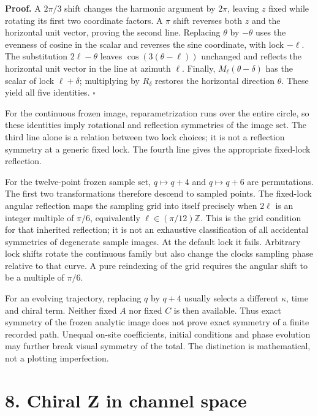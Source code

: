 \documentclass[
  11pt,
  a4paper,
]{article}
\begin{document}
\textbf{Proof.} A \(2\pi/3\) shift changes the harmonic argument by \(2\pi\), leaving \(z\) fixed while rotating its first two coordinate factors. A \(\pi\) shift reverses both \(z\) and the horizontal unit vector, proving the second line. Replacing \(\theta\) by \(-\theta\) uses the evenness of cosine in the scalar and reverses the sine coordinate, with lock \(-\ell\). The substitution \(2\ell-\theta\) leaves \(\cos(3(\theta-\ell))\) unchanged and reflects the horizontal unit vector in the line at azimuth \(\ell\). Finally, \(M_\ell(\theta-\delta)\) has the scalar of lock \(\ell+\delta\); multiplying by \(R_\delta\) restores the horizontal direction \(\theta\). These yield all five identities. \(\square\)

For the continuous frozen image, reparametrization runs over the entire circle, so these identities imply rotational and reflection symmetries of the image set. The third line alone is a relation between two lock choices; it is not a reflection symmetry at a generic fixed lock. The fourth line gives the appropriate fixed-lock reflection.

For the twelve-point frozen sample set, \(q\mapsto q+4\) and \(q\mapsto q+6\) are permutations. The first two transformations therefore descend to sampled points. The fixed-lock angular reflection maps the sampling grid into itself precisely when \(2\ell\) is an integer multiple of \(\pi/6\), equivalently \(\ell\in(\pi/12)\mathbb Z\). This is the grid condition for that inherited reflection; it is not an exhaustive classification of all accidental symmetries of degenerate sample images. At the default lock it fails. Arbitrary lock shifts rotate the continuous family but also change the clock\textquotesingle s sampling phase relative to that curve. A pure reindexing of the grid requires the angular shift to be a multiple of \(\pi/6\).

For an evolving trajectory, replacing \(q\) by \(q+4\) usually selects a different \(\kappa\), time and chiral term. Neither fixed \(A\) nor fixed \(C\) is then available. Thus exact symmetry of the frozen analytic image does not prove exact symmetry of a finite recorded path. Unequal on-site coefficients, initial conditions and phase evolution may further break visual symmetry of the total. The distinction is mathematical, not a plotting imperfection.

\section{8. Chiral Z in channel space}\label{chiral-z-in-channel-space}
\end{document}
